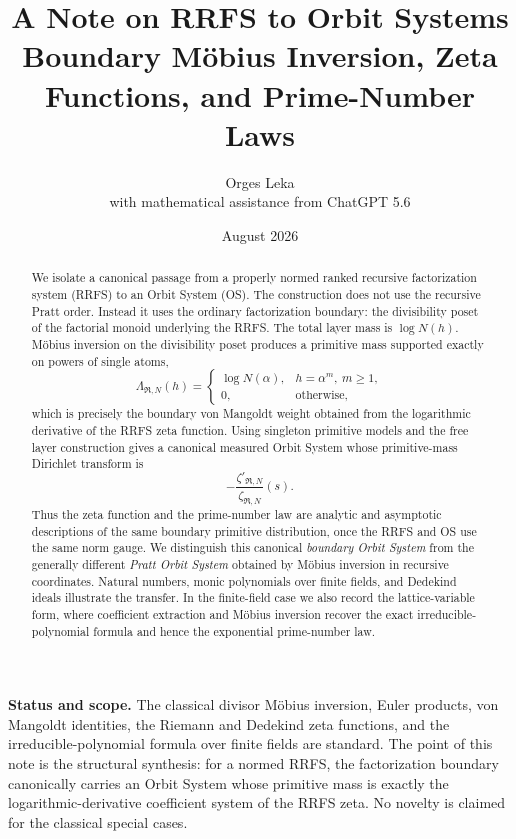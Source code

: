 \documentclass[11pt]{article}
\title{\textbf{A Note on RRFS to Orbit Systems}\\[0.35em]
\large Boundary M\"obius Inversion, Zeta Functions, and Prime-Number Laws}
\author{Orges Leka\\\small with mathematical assistance from ChatGPT 5.6}
\date{August 2026}
\newcommand{\cR}{\mathfrak R}
\begin{document}
\maketitle

\begin{abstract}
We isolate a canonical passage from a properly normed ranked recursive factorization system (RRFS) to an Orbit System (OS). The construction does not use the recursive Pratt order. Instead it uses the ordinary factorization boundary: the divisibility poset of the factorial monoid underlying the RRFS. The total layer mass is $\log N(h)$. M\"obius inversion on the divisibility poset produces a primitive mass supported exactly on powers of single atoms,
\[
\Lambda_{\cR,N}(h)=
\begin{cases}
\log N(\alpha),&h=\alpha^m,\ m\ge1,\\
0,&\text{otherwise},
\end{cases}
\]
which is precisely the boundary von Mangoldt weight obtained from the logarithmic derivative of the RRFS zeta function. Using singleton primitive models and the free layer construction gives a canonical measured Orbit System whose primitive-mass Dirichlet transform is
\[
-\frac{\zeta'_{\cR,N}}{\zeta_{\cR,N}}(s).
\]
Thus the zeta function and the prime-number law are analytic and asymptotic descriptions of the same boundary primitive distribution, once the RRFS and OS use the same norm gauge. We distinguish this canonical \emph{boundary Orbit System} from the generally different \emph{Pratt Orbit System} obtained by M\"obius inversion in recursive coordinates. Natural numbers, monic polynomials over finite fields, and Dedekind ideals illustrate the transfer. In the finite-field case we also record the lattice-variable form, where coefficient extraction and M\"obius inversion recover the exact irreducible-polynomial formula and hence the exponential prime-number law.
\end{abstract}

\textbf{Status and scope.}
The classical divisor M\"obius inversion, Euler products, von Mangoldt identities, the Riemann and Dedekind zeta functions, and the irreducible-polynomial formula over finite fields are standard. The point of this note is the structural synthesis: for a normed RRFS, the factorization boundary canonically carries an Orbit System whose primitive mass is exactly the logarithmic-derivative coefficient system of the RRFS zeta. No novelty is claimed for the classical special cases.

\tableofcontents
\end{document}
